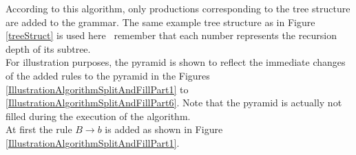 \begin{testexample}
	According to this algorithm, only productions corresponding to the tree structure are added to the grammar. The same example tree structure as in Figure \ref{treeStruct} is used here \textendash~remember that each number represents the recursion depth of its subtree.\\ For illustration purposes, the pyramid is shown to reflect the immediate changes of the added rules to the pyramid in the Figures \ref{IllustrationAlgorithmSplitAndFillPart1} to \ref{IllustrationAlgorithmSplitAndFillPart6}. Note that the pyramid is actually not filled during the execution of the algorithm.\\	
	
	\noindent At first the rule $B\longrightarrow b$ is added as shown in Figure \ref{IllustrationAlgorithmSplitAndFillPart1}.\\
	\pagebreak
	

\end{testexample}
